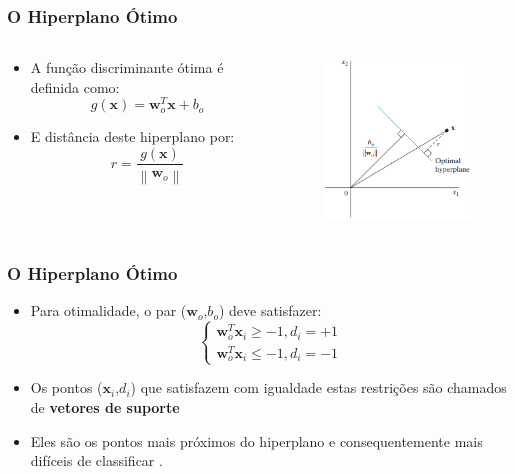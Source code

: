 \documentclass{beamer}
\begin{document}
\begin{frame}
	\frametitle{O Hiperplano Ótimo}
	\begin{columns}
		\begin{column}{0.5\textwidth}  
			\begin{center}
				\begin{itemize}
					\item A função discriminante ótima é definida como:
					\begin{equation}
						g(\textbf{x}) = \textbf{w}^T_o\textbf{x} + b_o
						\label{eq:plano-opt}
					\end{equation}		
					\item E distância deste hiperplano por:
					\begin{equation}
						r = \frac{g(\textbf{x})}{\left \| \textbf{w}_o \right \|} 
						\label{eq:plano-dist}
					\end{equation}		
				\end{itemize}
			\end{center}
		\end{column}
		\begin{column}{0.5\textwidth}
			\begin{figure}[h!]
				\centering
				\includegraphics[width=2in]{fig04.png}
				\label{fig:haykin-03}
			\end{figure}
		\end{column}
	\end{columns}
\end{frame}


\begin{frame}
	\frametitle{O Hiperplano Ótimo}
	\begin{itemize}
		\item Para otimalidade, o par ($\textbf{w}_o$,$b_o$) deve satisfazer:
		\begin{equation}
		\begin{cases}
			\textbf{w}^T_o\textbf{x}_i \geq -1, d_i = +1 \\ 
			\textbf{w}^T_o\textbf{x}_i \leq -1 , d_i = -1
		\end{cases}
		\label{eq:plano-cond}
		\end{equation}
		\item Os pontos ($\textbf{x}_i$,$d_i$) que satisfazem com igualdade estas restrições são chamados de \textbf{vetores de suporte}
		\item Eles são os pontos mais próximos do hiperplano e consequentemente mais difíceis de classificar \cite{haykin}.
	\end{itemize}

\end{frame}
\end{document}

